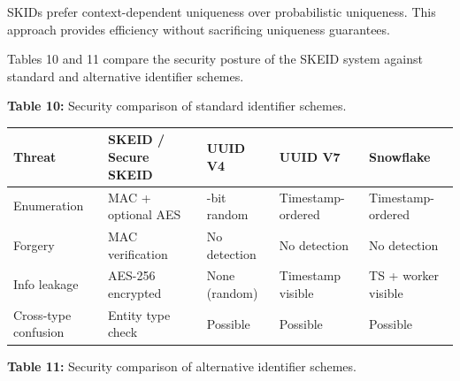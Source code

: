 \documentclass[fleqn,10pt]{wlpeerj}
\newcounter{none} %
\begin{document}
SKIDs prefer context-dependent uniqueness over probabilistic uniqueness.
This approach provides efficiency without sacrificing uniqueness
guarantees.

Tables 10 and 11 compare the security posture of the SKEID system
against standard and alternative identifier schemes.

\textbf{Table 10:} Security comparison of standard identifier schemes.

{\def\LTcaptype{none} %
\begin{longtable}[]{@{}
  >{\raggedright\arraybackslash}p{}
  >{\raggedright\arraybackslash}p{}
  >{\raggedright\arraybackslash}p{}
  >{\raggedright\arraybackslash}p{}
  >{\raggedright\arraybackslash}p{}@{}}
\toprule\noalign{}
\begin{minipage}[b]{\linewidth}\raggedright
Threat
\end{minipage} & \begin{minipage}[b]{\linewidth}\raggedright
SKEID / Secure SKEID
\end{minipage} & \begin{minipage}[b]{\linewidth}\raggedright
UUID V4
\end{minipage} & \begin{minipage}[b]{\linewidth}\raggedright
UUID V7
\end{minipage} & \begin{minipage}[b]{\linewidth}\raggedright
Snowflake
\end{minipage} \\
\midrule\noalign{}
\endhead
\bottomrule\noalign{}
\endlastfoot
Enumeration & MAC + optional AES & 122-bit random & Timestamp-ordered &
Timestamp-ordered \\
Forgery & MAC verification & No detection & No detection & No
detection \\
Info leakage & AES-256 encrypted & None (random) & Timestamp visible &
TS + worker visible \\
Cross-type confusion & Entity type check & Possible & Possible &
Possible \\
\end{longtable}
}

\textbf{Table 11:} Security comparison of alternative identifier
schemes.
\end{document}
